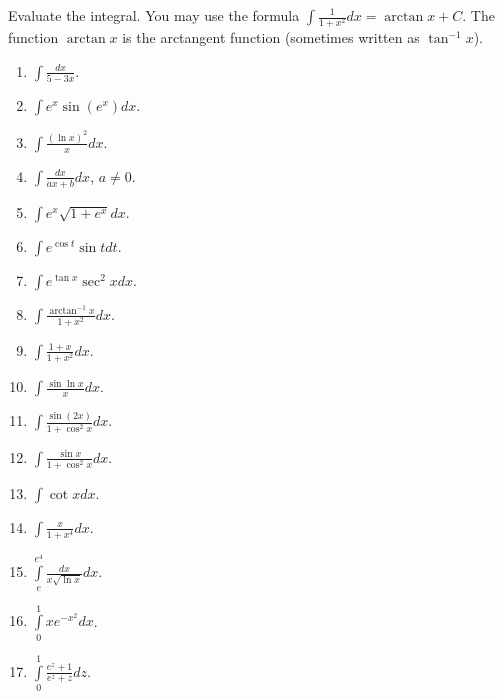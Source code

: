 \begin{problem}
Evaluate the integral. You may use the formula $\int \frac{1}{1+x^2}dx=\arctan x+C $. The function $\arctan x$ is the arctangent function (sometimes written as $\tan^{-1}x$).
\begin{multicols}{2}
\begin{enumerate}
\item $\displaystyle\int \frac{dx}{5-3x}$.
\item $\displaystyle\int e^x\sin (e^x) dx$.
\item $\displaystyle\int \frac{(\ln x)^2}{x} dx$.
\item $\displaystyle\int \frac{dx}{ax+b} dx$, $a\neq 0$.
\item $\displaystyle\int e^x\sqrt{1+e^x} dx$.
\item $\displaystyle\int e^{\cos t }\sin t dt$.
\item $\displaystyle\int e^{\tan x}\sec^2x dx$.
\item $\displaystyle\int \frac{\arctan^{-1}x}{1+x^2} dx$. 
\item $\displaystyle\int \frac{1+x}{1+x^2} dx$. 
\item $\displaystyle\int \frac{\sin \ln x}{x} dx$.
\item $\displaystyle\int \frac{\sin (2x)}{1+\cos^2x}dx$.
\item $\displaystyle\int \frac{\sin x}{1+\cos^2 x} dx$.
\item $\displaystyle\int \cot x dx$.
\item $\displaystyle\int \frac{x}{1+x^4}dx$.
\item $\displaystyle\int\limits_{e}^{e^4}\frac{dx}{x\sqrt{\ln x}} dx$.
\item $\displaystyle\int\limits_{0}^{1}xe^{-x^2} dx$.
\item $\displaystyle\int\limits_{0}^{1}\frac{e^z+1}{e^z+z} dz$.
\end{enumerate}
\end{multicols}
\end{problem}